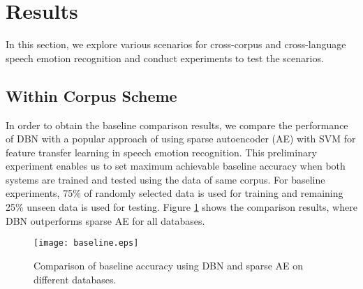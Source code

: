 \documentclass[a4paper]{article}
\newcommand*{\RR}[1]{\textcolor{purple}{#1}}
\begin{document}
\section{Results}
\label{sec:experimentation}


In this section, we explore various scenarios for cross-corpus and cross-language speech emotion recognition and conduct experiments to test the scenarios.  %

\subsection{Within Corpus Scheme}
In order to obtain the baseline comparison results, we compare the performance of DBN with a popular approach of using sparse autoencoder (AE) with SVM for feature transfer learning in speech emotion recognition\cite{deng2013sparse}. This preliminary experiment enables us to set maximum achievable baseline accuracy when both systems are trained and tested using the data of same corpus. %
For baseline experiments, 75\% of randomly selected data is used for training and remaining 25\% unseen data is used for testing. 
Figure \ref{fig:base} shows the comparison results, where DBN  outperforms sparse AE for all databases. %



\begin{figure}[!ht]
\centering
\centerline{\texttt{[image: baseline.eps]}}
\caption{Comparison of baseline accuracy using DBN and sparse AE on different databases.}
\label{fig:base}
\end{figure}
\end{document}
